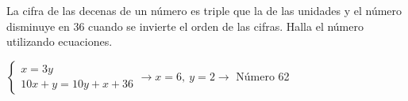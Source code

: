 \documentclass[addpoints,spanish, 12pt,a4paper]{exam}
\begin{document}
\begin{questions}




\question[1] La cifra de las decenas de un número es triple que la de las unidades y el número disminuye en 36 cuando se invierte el orden de las cifras. Halla el número utilizando ecuaciones.
\begin{solution} $\left\{\begin{matrix}x=3y \\ 10x+y=10y+x+36\end{matrix}\right. \to  x = 6, \  y = 2 \to $ Número 62 \end{solution}



\end{questions}
\end{document}
